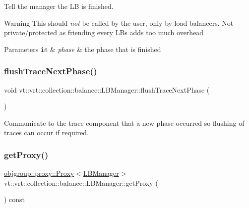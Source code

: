 Tell the manager the LB is finished. 

\begin{DoxyWarning}{Warning}
This should {\itshape not} be called by the user, only by load balancers. Not private/protected as friending every L\+Bs adds too much overhead
\end{DoxyWarning}

\begin{DoxyParams}[1]{Parameters}
\mbox{\tt in}  & {\em phase} & the phase that is finished \\
\hline
\end{DoxyParams}
\mbox{\label{structvt_1_1vrt_1_1collection_1_1balance_1_1_l_b_manager_a5d22a62d49f296b4e77166667ed780d8}} 
\subsubsection{\texorpdfstring{flush\+Trace\+Next\+Phase()}{flushTraceNextPhase()}}
{\footnotesize\ttfamily void vt\+::vrt\+::collection\+::balance\+::\+L\+B\+Manager\+::flush\+Trace\+Next\+Phase (\begin{DoxyParamCaption}{ }\end{DoxyParamCaption})}



Communicate to the trace component that a new phase occurred so flushing of traces can occur if required. 

\mbox{\label{structvt_1_1vrt_1_1collection_1_1balance_1_1_l_b_manager_aa0fbba6d90873e5fa6e40767efcabb5c}} 
\subsubsection{\texorpdfstring{get\+Proxy()}{getProxy()}}
{\footnotesize\ttfamily \hyperlink{structvt_1_1objgroup_1_1proxy_1_1_proxy}{objgroup\+::proxy\+::\+Proxy}$<$\hyperlink{structvt_1_1vrt_1_1collection_1_1balance_1_1_l_b_manager}{L\+B\+Manager}$>$ vt\+::vrt\+::collection\+::balance\+::\+L\+B\+Manager\+::get\+Proxy (\begin{DoxyParamCaption}{ }\end{DoxyParamCaption}) const\hspace{0.3cm}{\ttfamily [inline]}}



